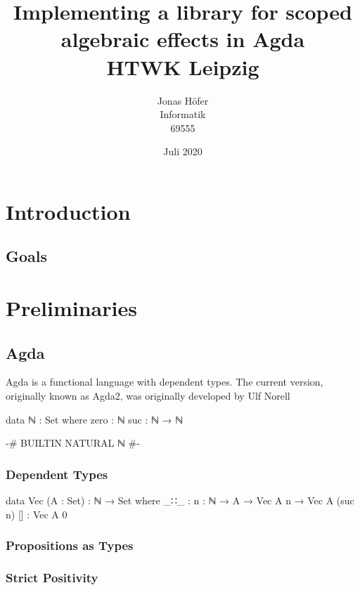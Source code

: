 \documentclass[10pt,a4paper,twoside]{report}
\title{
  {\huge\textbf{Implementing a library for scoped algebraic effects in Agda}}\\
  {\large HTWK Leipzig}
}
\author{
  {Jonas Höfer}\\
  {Informatik}\\
  {69555}
}
\date{Juli 2020}
\begin{document}
\maketitle
\begin{abstract}
\end{abstract}

\tableofcontents

\chapter{Introduction}
\section{Goals}

\chapter{Preliminaries}
\section{Agda}

Agda is a functional language with dependent types.
The current version, originally known as Agda2, was originally developed by Ulf
Norell \cite{norell:thesis}

\begin{code}
data ℕ : Set where
  zero  : ℕ
  suc   : ℕ → ℕ
\end{code}
\begin{code}[hide]
{-# BUILTIN NATURAL ℕ #-}
\end{code}

\subsection{Dependent Types}
\begin{code}
data Vec (A : Set) : ℕ → Set where
  _∷_  : {n : ℕ} → A → Vec A n → Vec A (suc n)
  []   : Vec A 0
\end{code}

\subsection{Propositions as Types}


\subsection{Strict Positivity}
\end{document}
